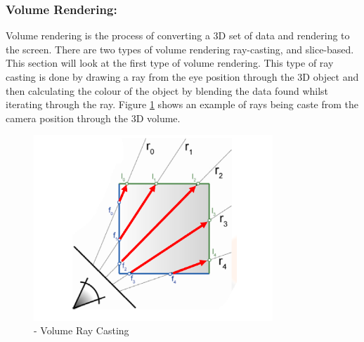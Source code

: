 \subsubsection{Volume Rendering:}
\label{sec:vr}

Volume rendering is the process of converting a 3D set of data and rendering to the screen.
There are two types of volume rendering ray-casting, and slice-based.
This section will look at the first type of volume rendering.
This type of ray casting is done by drawing a ray from the eye position through the 3D object and then calculating the colour of the object by blending the data found whilst iterating through the ray.
Figure \ref{fig:ray_casting2} shows an example of rays being caste from the camera position through the 3D volume.

\begin{figure}[ht!]
	\centering
	\includegraphics[width=90mm]{images/ray_thumb.PNG}
	\caption{\cite{KHayward09} - Volume Ray Casting}
	\label{fig:ray_casting2}
\end{figure}